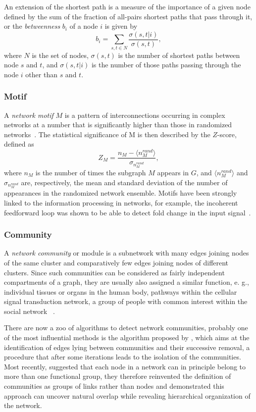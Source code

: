 An extension of the shortest path is a measure of the importance of a given 
node defined by the sum of the fraction of all-pairs shortest paths that pass 
through it, or the 
\emph{betweenness} $b_i$ of a node $i$ is given by
\begin{equation}
b_i = \sum_{s,t \in N} \frac{\sigma(s,t|i)}{\sigma(s,t)},
\end{equation}
where $N$ is the set of nodes, $\sigma(s,t)$ is the number of shortest paths 
between node $s$ and $t$, and $\sigma(s,t|i)$ is the number of those paths 
passing through the node $i$ other than $s$ and $t$.

\subsubsection{Motif}
A \emph{network motif} $M$ is a pattern of interconnections occurring in complex 
networks at a number that is significantly higher than those in randomized 
networks~\citep{Milo2002,Shen-Orr2002}. The statistical significance of M is 
then described by the $Z$-score, defined as
\begin{equation}
Z_M = \frac{n_M - \langle n_M^{rand} \rangle}{\sigma_{n_M^{rand}}},
\end{equation}
where $n_M$ is the number of times the subgraph $M$ appears in $G$, and 
$\langle n_M^{rand} \rangle$ and $\sigma_{n_M^{rand}}$ are, respectively, 
the mean and 
standard deviation of the number of appearances in the randomized network ensemble.
Motifs have been strongly linked to the information processing in networks, 
for example, the incoherent feedforward loop was shown to be able to detect
fold change in the input signal~\citep{Goentoro2009}.

\subsubsection{Community}
A \emph{network community} or module is a subnetwork with many edges joining
nodes of the same cluster and comparatively few edges joining nodes of 
different clusters. Since such communities can be considered as fairly 
independent compartments of a graph, they are usually also assigned 
a similar function, e. g., individual tissues or organs in the human body,
pathways within the cellular signal transduction network, a group of people
with common interest within the social network~%
\citep{Fortunato2010,Newman2012}.

There are now a zoo of algorithms to detect network communities, probably one
of the most influential methods is the algorithm proposed by \cite{Girvan2002},
which aims at the identification of edges lying between communities and their 
successive removal, a procedure that after some iterations
leads to the isolation of the communities. Most recently, \cite{Ahn2010b} 
suggested that each node in a network can in principle belong to more than 
one functional group, they therefore reinvented the definition of communities 
as groups of links rather than nodes and demonstrated this approach can uncover
natural overlap while revealing hierarchical organization of the network.

